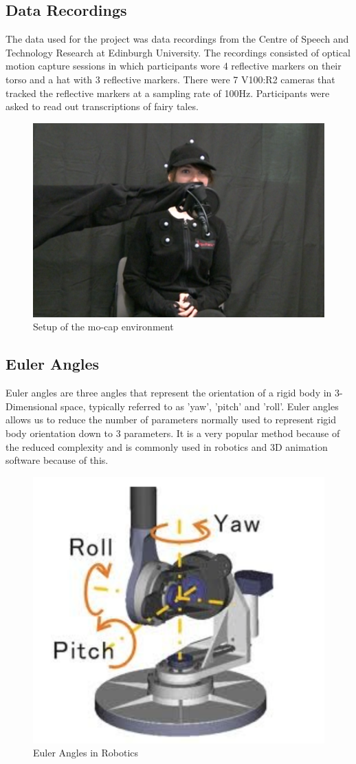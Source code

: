 \documentclass[bsc,frontabs,twoside,singlespacing,parskip]{infthesis}
\begin{document}
\subsection{Data Recordings}

The data used for the project was data recordings from the Centre of Speech and Technology Research at Edinburgh University. The recordings consisted of optical motion capture sessions in which participants wore 4 reflective markers on their torso and a hat with 3 reflective markers. There were 7 V100:R2 cameras that tracked the reflective markers at a sampling rate of 100Hz. Participants were asked to read out transcriptions of fairy tales.

\begin{figure}[h!]
	\caption{Setup of the mo-cap environment}
	\centering
	\includegraphics[width=.5\textwidth]{mocap.png}
\end{figure}


\subsection{Euler Angles}

Euler angles are three angles that represent the orientation of a rigid body in 3-Dimensional space, typically referred to as 'yaw', 'pitch' and 'roll'. Euler angles allows us to reduce the number of parameters normally used to represent rigid body orientation down to 3 parameters. It is a very popular method because of the reduced complexity and is commonly used in robotics and 3D animation software because of this. 

\begin{figure}[h!]
	\caption{Euler Angles in Robotics}
	\centering
	\includegraphics[width=.5\textwidth]{euler_angles.png}
\end{figure}
\end{document}
